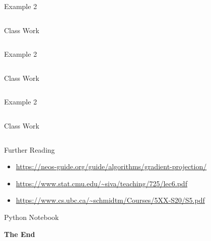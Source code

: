 \documentclass[aspectratio=169,xcolor=dvipsnames,svgnames,x11names,fleqn]{beamer}
\begin{document}
\begin{frame}{Example 2}
    \begin{columns}

    {\color{lightgray}Class Work}

    \end{columns}
\end{frame}

\begin{frame}{Example 2}
    \begin{columns}

    {\color{lightgray}Class Work}

    \end{columns}
\end{frame}


\begin{frame}{Example 2}
    \begin{columns}

    {\color{lightgray}Class Work}

    \end{columns}
\end{frame}



\begin{frame}{Further Reading}
\begin{itemize}
\item \url{https://neos-guide.org/guide/algorithms/gradient-projection/}
\item \url{https://www.stat.cmu.edu/~siva/teaching/725/lec6.pdf}
\item \url{https://www.cs.ubc.ca/~schmidtm/Courses/5XX-S20/S5.pdf}
\end{itemize}
\end{frame}

    
    \begin{frame}[containsverbatim]{Python Notebook}
    \begin{center}
    \small
    
    \end{center}
    \end{frame}
    
    
    \begin{frame}
        \Huge{\centerline{\color{MediumBlue}\textbf{The End}}}
    \end{frame}
\end{document}
